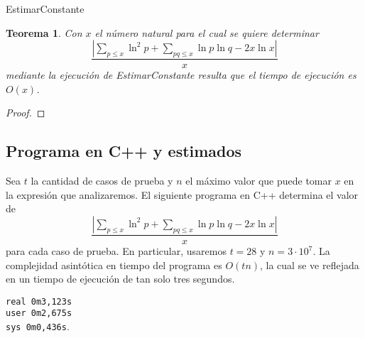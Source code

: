 \documentclass[10pt]{article}
\newcommand\cppfile[2][]{}
\newtheorem{theorem}{Teorema}
\theoremstyle{definition}
\theoremstyle{remark}
\begin{document}
\begin{algorithm}[H]
\SetAlgoLined
\DontPrintSemicolon
{}
\caption{EstimarConstante}
\end{algorithm}

\begin{theorem}
Con $x$ el n\'umero natural para el cual se quiere determinar
$$\frac{|\sum_{p \leq x} \ln^2 p + \sum_{pq \leq x} \ln p \ln q - 2x\ln x|}{x}$$
mediante la ejecuci\'on de EstimarConstante
resulta que el tiempo de ejecuci\'on es $O(x)$.
\end{theorem}

\begin{proof}
\end{proof}

\subsection{Programa en C++ y estimados}

Sea $t$ la cantidad de casos de prueba y $n$ el m\'aximo valor que puede tomar $x$ en la expresi\'on que analizaremos. 
El siguiente programa en C++ determina el valor de 
$$\frac{|\sum_{p \leq x} \ln^2 p + \sum_{pq \leq x} \ln p \ln q - 2x\ln x|}{x}$$
para cada caso de prueba.
En particular, usaremos $t = 28$ y $n = 3 \cdot 10^7$.
La complejidad asint\'otica en tiempo del programa es $O(tn)$, la cual se ve reflejada en un tiempo de ejecuci\'on
de tan solo tres segundos.

\begin{center}
    \texttt{real	0m3,123s}\\
    \texttt{user	0m2,675s}\\
    \texttt{sys	0m0,436s}.
\end{center}

\cppfile{formula_selberg.cpp}
\end{document}

